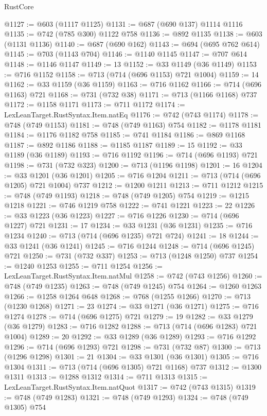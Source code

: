\begin{lexlean}{RustCore}
\begin{coremodule}
@1127 := @603 (@1117 @1125)
@1131 := @687 (@690 @137) @1114 @1116
@1135 := @742 (@785 @300) @1122 @758
@1136 := @892 @1135
@1138 := @603 (@1131 @1136)
@1140 := @687 (@690 @162)
@1143 := @694 (@695 @762 @614)
@1145 := @703 (@1143 @704)
@1146 := @1140 @1145
@1147 := @707 @614
@1148 := @1146 @1147
@1149 := 13
@1152 := @33 @1149 (@36 @1149)
@1153 := @716 @1152
@1158 := @713 (@714 (@696 @1153) @721 @1004)
@1159 := 14
@1162 := @33 @1159 (@36 @1159)
@1163 := @716 @1162
@1166 := @714 (@696 @1163) @721
@1168 := @731 (@732 @38)
@1171 := @713 (@1166 @1168) @737
@1172 := @1158 @1171
@1173 := @711 @1172
@1174 := LexLeanTarget.RustSyntax.Item.natEq
@1176 := @742 (@743 @1174)
@1178 := @748 (@749 @1153)
@1181 := @748 (@749 @1163) @754
@1182 := @1178 @1181
@1184 := @1176 @1182 @758
@1185 := @741 @1184
@1186 := @869 @1168
@1187 := @892 @1186
@1188 := @1185 @1187
@1189 := 15
@1192 := @33 @1189 (@36 @1189)
@1193 := @716 @1192
@1196 := @714 (@696 @1193) @721
@1198 := @731 (@732 @323)
@1200 := @713 (@1196 @1198)
@1201 := 16
@1204 := @33 @1201 (@36 @1201)
@1205 := @716 @1204
@1211 := @713 (@714 (@696 @1205) @721 @1004) @737
@1212 := @1200 @1211
@1213 := @711 @1212
@1215 := @748 (@749 @1193)
@1218 := @748 (@749 @1205) @754
@1219 := @1215 @1218
@1221 := @746 @1219 @758
@1222 := @741 @1221
@1223 := 22
@1226 := @33 @1223 (@36 @1223)
@1227 := @716 @1226
@1230 := @714 (@696 @1227) @721
@1231 := 17
@1234 := @33 @1231 (@36 @1231)
@1235 := @716 @1234
@1240 := @713 (@714 (@696 @1235) @721 @724)
@1241 := 18
@1244 := @33 @1241 (@36 @1241)
@1245 := @716 @1244
@1248 := @714 (@696 @1245) @721
@1250 := @731 (@732 @337)
@1253 := @713 (@1248 @1250) @737
@1254 := @1240 @1253
@1255 := @711 @1254
@1256 := LexLeanTarget.RustSyntax.Item.natMul
@1258 := @742 (@743 @1256)
@1260 := @748 (@749 @1235)
@1263 := @748 (@749 @1245) @754
@1264 := @1260 @1263
@1266 := @1258 @1264 @648
@1268 := @768 (@1255 @1266)
@1270 := @713 (@1230 @1268)
@1271 := 23
@1274 := @33 @1271 (@36 @1271)
@1275 := @716 @1274
@1278 := @714 (@696 @1275) @721
@1279 := 19
@1282 := @33 @1279 (@36 @1279)
@1283 := @716 @1282
@1288 := @713 (@714 (@696 @1283) @721 @1004)
@1289 := 20
@1292 := @33 @1289 (@36 @1289)
@1293 := @716 @1292
@1296 := @714 (@696 @1293) @721
@1298 := @731 (@732 @87)
@1300 := @713 (@1296 @1298)
@1301 := 21
@1304 := @33 @1301 (@36 @1301)
@1305 := @716 @1304
@1311 := @713 (@714 (@696 @1305) @721 @1168) @737
@1312 := @1300 @1311
@1313 := @1288 @1312
@1314 := @711 @1313
@1315 := LexLeanTarget.RustSyntax.Item.natQuot
@1317 := @742 (@743 @1315)
@1319 := @748 (@749 @1283)
@1321 := @748 (@749 @1293)
@1324 := @748 (@749 @1305) @754

\end{coremodule}
\end{lexlean}
